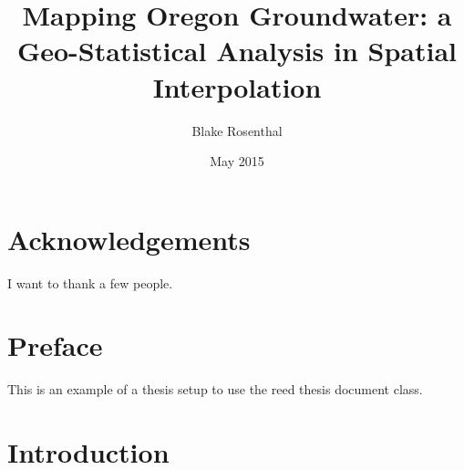 \documentclass[12pt,twoside]{reedthesis}
\title{Mapping Oregon Groundwater: a Geo-Statistical Analysis in Spatial Interpolation}
\author{Blake Rosenthal}
\date{May 2015}
\begin{document}
  \maketitle
  \frontmatter %
  \pagestyle{empty} %

    \chapter*{Acknowledgements}
	I want to thank a few people.

    \chapter*{Preface}
	This is an example of a thesis setup to use the reed thesis document class.

    \tableofcontents
    \listoftables
    \listoffigures

	

  \mainmatter %
  \pagestyle{fancyplain} %


    \chapter*{Introduction}
\end{document}
